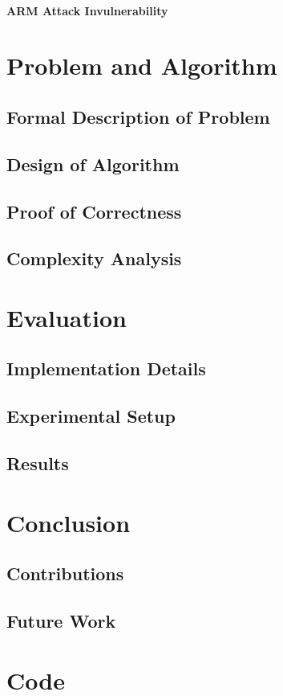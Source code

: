\documentclass[fyp]{socreport}
\begin{document}
\subsubsection{ARM Attack Invulnerability}

\chapter{Problem and Algorithm}
\section{Formal Description of Problem}
\section{Design of Algorithm}
\section{Proof of Correctness}
\section{Complexity Analysis}

\chapter{Evaluation}
\section{Implementation Details}
\section{Experimental Setup}
\section{Results}

\chapter{Conclusion}
\section{Contributions}
\section{Future Work}




\appendix
\chapter{Code}
\end{document}
